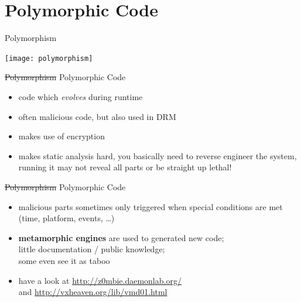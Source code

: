 \documentclass[beamer]{uibk}
\begin{document}

\section{Polymorphic Code}

\begin{frame}{Polymorphism}
    \begin{center}
        \texttt{[image: polymorphism]}
    \end{center}
\end{frame}

\begin{frame}{\st{Polymorphism} Polymorphic Code}
    \begin{itemize}
        \item code which \emph{evolves} during runtime
        \item often malicious code, but also used in DRM
        \item makes use of encryption
        \medskip
        \pause
        \item makes static analysis hard, you basically need to reverse
            engineer the system,\\
            running it may not reveal all parts or be straight up lethal!
    \end{itemize}
\end{frame}

\begin{frame}{\st{Polymorphism} Polymorphic Code}
    \begin{itemize}
        \item malicious parts sometimes only triggered when special conditions
            are met (time, platform, events, \dots)
        \medskip
        \pause
        \item \textbf{metamorphic engines} are used to generated new code;\\
            little documentation / public knowledge;\\
            some even see it as taboo
        \medskip
        \pause
        \item have a look at \url{http://z0mbie.daemonlab.org/}\\
            and \url{http://vxheaven.org/lib/vmd01.html}
    \end{itemize}
\end{frame}
\end{document}
